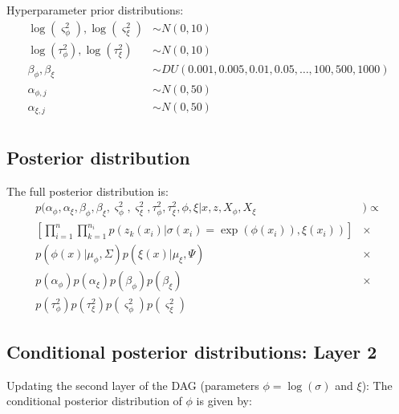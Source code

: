 \documentclass{article}
\begin{document}
Hyperparameter prior distributions:
\begin{align*}
\log(\varsigma^2_\phi), \log(\varsigma^2_\xi)&\sim N(0, 10) \\
\log(\tau^2_\phi), \log(\tau^2_\xi) &\sim N(0, 10) \\
\beta_\phi, \beta_\xi &\sim DU(0.001, 0.005, 0.01, 0.05, \dots , 100, 500, 1000)\\
\alpha_{\phi,j} &\sim N(0, 50)\\
\alpha_{\xi,j} &\sim N(0, 50)\\
\end{align*}


\subsection*{Posterior distribution}

The full posterior distribution is:
\begin{align*}
p(\alpha_\phi, \alpha_\xi, \beta_\phi, \beta_\xi, \varsigma^2_\phi, \varsigma^2_\xi, \tau^2_\phi, \tau^2_\xi, \phi, \xi | x, z, X_\phi, X_\xi &) \propto \\
\left[ \prod_{i=1}^n \prod_{k=1}^{n_i} p(z_k(x_i) | \sigma(x_i)=\exp(\phi(x_i)), \xi(x_i)) \right] & \times \\
p(\phi(x) | \mu_\phi, \Sigma) p(\xi(x) | \mu_\xi, \Psi) & \times \\
p(\alpha_\phi) p(\alpha_\xi) p(\beta_\phi) p(\beta_\xi) & \times \\
p(\tau^2_\phi) p(\tau^2_\xi) p(\varsigma^2_\phi) p(\varsigma^2_\xi) &
\end{align*}

\subsection*{Conditional posterior distributions: Layer 2}

Updating the second layer of the DAG (parameters $\phi = \log(\sigma)$ and $\xi$): The conditional posterior distribution of $\phi$ is given by:
\end{document}
